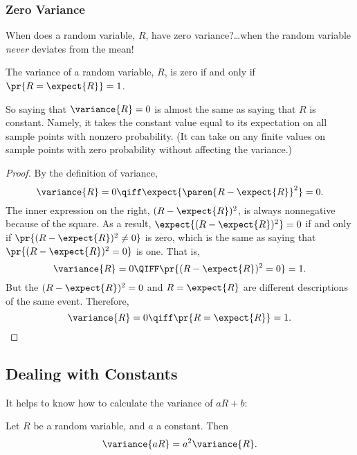 \begin{editingnotes}

\subsubsection{Zero Variance}

When does a random variable, $R$, have zero variance?\dots when the random
variable \emph{never} deviates from the mean!
\begin{lemma*}%
The variance of a random variable, $R$, is zero if and only if $\pr{R =
\expect{R}} = 1$.
\end{lemma*}

So saying that $\variance{R}=0$ is almost the same as saying that $R$ is
constant.  Namely, it takes the constant value equal to its expectation on
all sample points with nonzero probability.  (It can take on any finite
values on sample points with zero probability without affecting the
variance.)

\begin{proof}
By the definition of variance,
\[
\variance{R} = 0\qiff \expect{\paren{R - \expect{R}}^2} = 0.
\]
The inner expression on the right, $(R - \expect{R})^2$, is always
nonnegative because of the square.  As a result, $\expect{(R -
\expect{R})^2} = 0$ if and only if $\pr{(R - \expect{R})^2 \neq 0}$ is
zero, which is the same as saying that $\pr{(R - \expect{R})^2 = 0}$ is
one.  That is,
\[
\variance{R} = 0 \QIFF \pr{(R - \expect{R})^2 = 0} = 1.
\]
But the $(R - \expect{R})^2 = 0$ and $R = \expect{R}$ are different
descriptions of the same event.  Therefore,
\[
\variance{R} = 0 \qiff \pr{R = \expect{R}} =1.
\]
\end{proof}

\end{editingnotes}

\subsection{Dealing with Constants}

It helps to know how to calculate the variance of $aR+b$:

\begin{theorem}\label{var.const}
Let $R$ be a random variable, and $a$ a constant. Then
\begin{equation}\label{a2R}
\variance{a R} = a^2 \variance{R}.
\end{equation}
\end{theorem}


